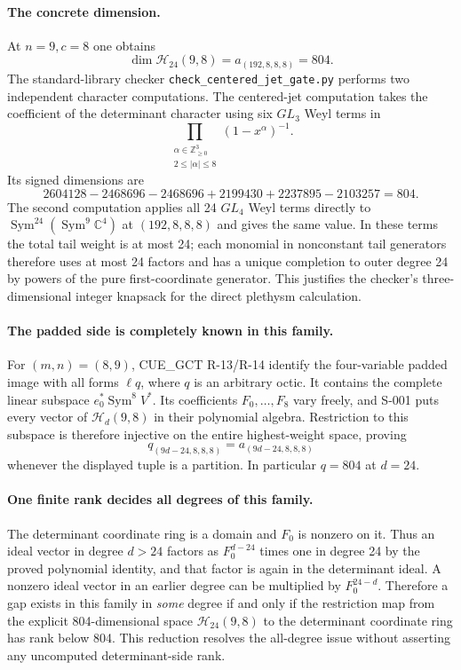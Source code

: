 \paragraph{The concrete dimension.}
At $n=9,c=8$ one obtains
\[
          \dim\mathcal H_{24}(9,8)
                  =a_{(192,8,8,8)}=804.
\]
The standard-library checker \texttt{check\_centered\_jet\_gate.py}
performs two independent character computations. The centered-jet
computation takes the coefficient of the determinant character using
six $GL_3$ Weyl terms in
\[
          \prod_{\substack{\alpha\in\mathbb Z_{\geq0}^3\\
                           2\leq|\alpha|\leq8}}(1-x^\alpha)^{-1}.
\]
Its signed dimensions are
\[
       2604128-2468696-2468696+2199430+2237895-2103257=804.
\]
The second computation applies all 24 $GL_4$ Weyl terms directly to
$\operatorname{Sym}^{24}(\operatorname{Sym}^9\mathbb C^4)$ at
$(192,8,8,8)$ and gives the same value. In these terms the total tail
weight is at most 24; each monomial in nonconstant tail generators
therefore uses at most 24 factors and has a unique completion to outer
degree 24 by powers of the pure first-coordinate generator. This
justifies the checker's three-dimensional integer knapsack for the
direct plethysm calculation.

\paragraph{The padded side is completely known in this family.}
For $(m,n)=(8,9)$, CUE\_GCT R-13/R-14 identify the four-variable padded
image with all forms $\ell q$, where $q$ is an arbitrary octic.
It contains the complete linear subspace $e_0^*\operatorname{Sym}^8V^*$.
Its coefficients $F_0,\ldots,F_8$ vary freely, and S-001 puts every
vector of $\mathcal H_d(9,8)$ in their polynomial algebra. Restriction
to this subspace is therefore injective on the entire highest-weight
space, proving
\[
                  q_{(9d-24,8,8,8)}=a_{(9d-24,8,8,8)}
\]
whenever the displayed tuple is a partition. In particular $q=804$
at $d=24$.

\paragraph{One finite rank decides all degrees of this family.}
The determinant coordinate ring is a domain and $F_0$ is nonzero on it.
Thus an ideal vector in degree $d>24$ factors as
$F_0^{d-24}$ times one in degree 24 by the proved polynomial identity,
and that factor is again in the determinant ideal. A nonzero ideal
vector in an earlier degree can be multiplied by $F_0^{24-d}$.
Therefore a gap exists in this family in \emph{some} degree if and only
if the restriction map from the explicit 804-dimensional space
$\mathcal H_{24}(9,8)$ to the determinant coordinate ring has rank below
804. This reduction resolves the all-degree issue without asserting any
uncomputed determinant-side rank.

